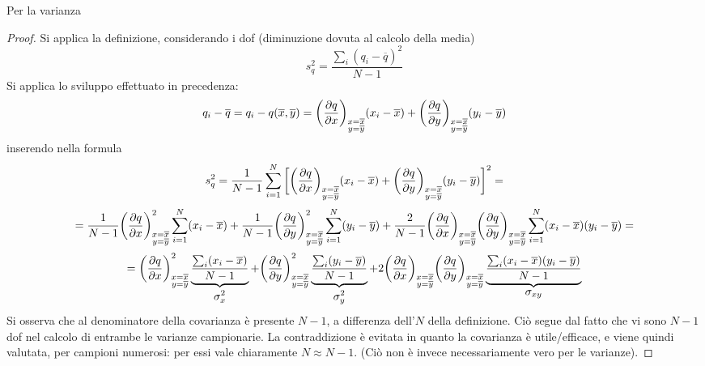 \documentclass[10pt, oneside]{book}
\begin{document}
Per la varianza
\begin{proof}
Si applica la definizione, considerando i dof (diminuzione dovuta al calcolo della media)
\[s_q^2 = \frac{\sum_i (q_i - \overline{q})^2}{N-1}\]
Si applica lo sviluppo effettuato in precedenza:
\[q_i - \overline{q} = q_i - q(\overline{x}, \overline{y}) = \bigg(\pdv{q}{x}\bigg)_{\substack{x = \overline{x}\\ y= \overline{y}}} (x_i - \overline{x})+  \bigg(\pdv{q}{y}\bigg)_{\substack{x = \overline{x}\\ y= \overline{y}}} (y_i - \overline{y})\]
inserendo nella formula
\[s_q^2 = \frac{1}{N-1} \sum\limits_{i=1}^N \bigg[\bigg(\pdv{q}{x}\bigg)_{\substack{x = \overline{x}\\ y= \overline{y}}} (x_i - \overline{x})+  \bigg(\pdv{q}{y}\bigg)_{\substack{x = \overline{x}\\ y= \overline{y}}} (y_i - \overline{y})\bigg]^2 =\]
\[= \frac{1}{N-1} \bigg(\pdv{q}{x}\bigg)_{\substack{x = \overline{x}\\ y= \overline{y}}}^2 \sum\limits_{i=1}^N (x_i - \overline{x}) +  \frac{1}{N-1}\bigg(\pdv{q}{y}\bigg)_{\substack{x = \overline{x}\\ y= \overline{y}}}^2 \sum\limits_{i=1}^N (y_i - \overline{y}) + \frac{2}{N-1} \bigg(\pdv{q}{x}\bigg)_{\substack{x = \overline{x}\\ y= \overline{y}}}\bigg(\pdv{q}{y}\bigg)_{\substack{x = \overline{x}\\ y= \overline{y}}} \sum\limits_{i=1}^N (x_i - \overline{x}) (y_i - \overline{y}) =\]
\[= \bigg(\pdv{q}{x}\bigg)_{\substack{x = \overline{x}\\ y= \overline{y}}}^2 \underbrace{\frac{\sum_i (x_i - \overline{x})}{N-1}}_{\displaystyle \sigma_x^2} + \bigg(\pdv{q}{y}\bigg)_{\substack{x = \overline{x}\\ y= \overline{y}}}^2 \underbrace{\frac{\sum_i (y_i - \overline{y})}{N-1}}_{\displaystyle \sigma_y^2} + 2 \bigg(\pdv{q}{x}\bigg)_{\substack{x = \overline{x}\\ y= \overline{y}}}\bigg(\pdv{q}{y}\bigg)_{\substack{x = \overline{x}\\ y= \overline{y}}} \underbrace{\frac{\sum_i (x_i - \overline{x}) (y_i - \overline{y})}{N-1}}_{\displaystyle \sigma_{xy}}\]
Si osserva che al denominatore della covarianza è presente $N-1$, a differenza dell'$N$ della definizione. Ciò segue dal fatto che vi sono $N-1$ dof nel calcolo di entrambe le varianze campionarie. La contraddizione è evitata in quanto la covarianza è utile/efficace, e viene quindi valutata, per campioni numerosi: per essi vale chiaramente $N \approx N-1$. (Ciò non è invece necessariamente vero per le varianze).
\end{proof}
\end{document}
